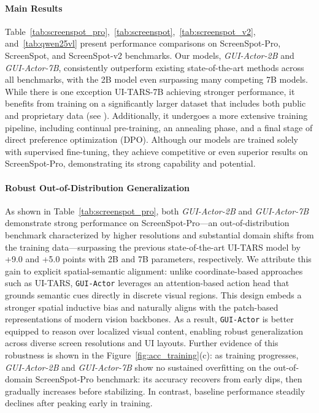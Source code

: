 \documentclass{article}
\newcommand{\huan}[1]{\textcolor{brown}{[Huan: #1]}}
\newcommand{\sys}{\texttt{GUI-Actor}\xspace}
\begin{document}
\paragraph{Main Results} Table~\ref{tab:screenspot_pro},~\ref{tab:screenspot},~\ref{tab:screenspot_v2}, and~\ref{tab:qwen25vl} present performance comparisons on ScreenSpot-Pro, ScreenSpot, and ScreenSpot-v2 benchmarks.
Our models, \textit{GUI-Actor-2B} and \textit{GUI-Actor-7B}, consistently outperform existing state-of-the-art methods across all benchmarks, with the 2B model even surpassing many competing 7B models.
While there is one exception UI-TARS-7B achieving stronger performance, it benefits from training on a significantly larger dataset that includes both public and proprietary data (see ). Additionally, it undergoes a more extensive training pipeline, including continual pre-training, an annealing phase, and a final stage of direct preference optimization (DPO). Although our models are trained solely with supervised fine-tuning, they achieve competitive or even superior results on ScreenSpot-Pro, demonstrating its strong capability and potential.

\paragraph{Robust Out-of-Distribution Generalization}
As shown in Table~\ref{tab:screenspot_pro}, both \textit{GUI-Actor-2B} and \textit{GUI-Actor-7B} demonstrate strong performance on ScreenSpot-Pro—an out-of-distribution benchmark characterized by higher resolutions and substantial domain shifts from the training data—surpassing the previous state-of-the-art UI-TARS model by +9.0 and +5.0 points with 2B and 7B parameters, respectively.
We attribute this gain to explicit spatial-semantic alignment: unlike coordinate-based approaches such as UI-TARS, \sys leverages an attention-based action head that grounds semantic cues directly in discrete visual regions. This design embeds a stronger spatial inductive bias and naturally aligns with the patch-based representations of modern vision backbones. As a result, \sys is better equipped to reason over localized visual content, enabling robust generalization across diverse screen resolutions and UI layouts.
Further evidence of this robustness is shown in the Figure~\ref{fig:acc_training}(c): as training progresses, \textit{GUI-Actor-2B} and \textit{GUI-Actor-7B} show no sustained overfitting on the out-of-domain ScreenSpot-Pro benchmark: its accuracy recovers from early dips, then gradually increases before stabilizing. In contrast, baseline performance steadily declines after peaking early in training.
\end{document}
